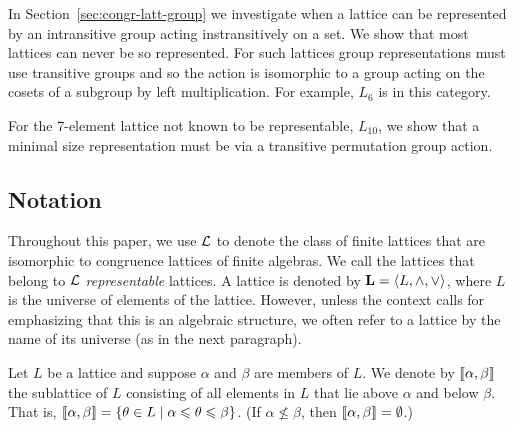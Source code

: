 In Section~\ref{sec:congr-latt-group} we investigate when
a lattice can be represented by an intransitive group acting 
instransitively on a set. We show that most lattices
can never be so represented. For such lattices group 
representations must use transitive groups and so the
action is isomorphic to a group acting on the cosets
of a subgroup by left multiplication. For example,
$L_6$ is in this category.


For the 7-element lattice not known to be representable, 
$L_{10}$, we show that a minimal size representation 
must be via a transitive permutation group action.
 











\subsection{Notation}

Throughout this paper, we use $\mathcal{L}$ to denote the class of finite lattices that
are isomorphic to congruence lattices of finite algebras. 
We call the lattices that belong to $\mathcal{L}$ \emph{representable} lattices.
A lattice is denoted by $\mathbf{L} = \langle L, \wedge, \vee\rangle$, where $L$
is the universe of elements of the lattice.  However, unless the context
calls for emphasizing that this is an algebraic structure, we often
refer to a lattice by the name of its universe (as in the next paragraph).

Let $L$ be a lattice and suppose $\alpha$ and $\beta$ are members of $L$.  
We denote by $\llbracket \alpha, \beta \rrbracket$ the sublattice of $L$ consisting of all
elements in $L$ that lie above $\alpha$ and below $\beta$.  
That is, 
$\llbracket \alpha, \beta \rrbracket = 
\{\theta \in L \mid \alpha \leqslant \theta \leqslant \beta\}$.
(If $\alpha \nleq \beta$, then $\llbracket \alpha, \beta \rrbracket = \emptyset$.)

